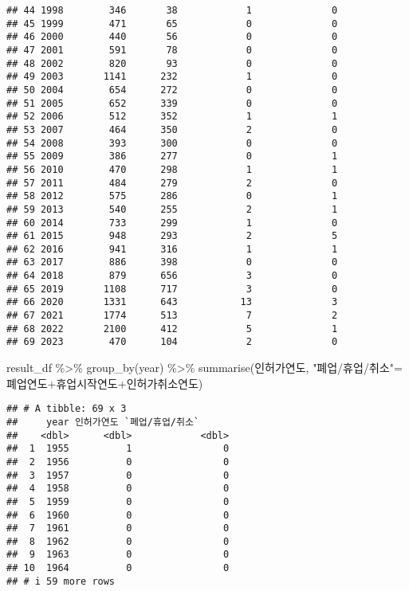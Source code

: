 \documentclass[
]{book}
\newenvironment{Shaded}{\begin{snugshade}}{\end{snugshade}}
\newcommand{\FunctionTok}[1]{\textcolor[rgb]{0.00,0.00,0.00}{#1}}
\newcommand{\NormalTok}[1]{#1}
\newcommand{\OtherTok}[1]{\textcolor[rgb]{0.56,0.35,0.01}{#1}}
\newcommand{\SpecialCharTok}[1]{\textcolor[rgb]{0.00,0.00,0.00}{#1}}
\newcommand{\StringTok}[1]{\textcolor[rgb]{0.31,0.60,0.02}{#1}}
\begin{document}
\begin{verbatim}
## 44 1998        346       38            1              0
## 45 1999        471       65            0              0
## 46 2000        440       56            0              0
## 47 2001        591       78            0              0
## 48 2002        820       93            0              0
## 49 2003       1141      232            1              0
## 50 2004        654      272            0              0
## 51 2005        652      339            0              0
## 52 2006        512      352            1              1
## 53 2007        464      350            2              0
## 54 2008        393      300            0              0
## 55 2009        386      277            0              1
## 56 2010        470      298            1              1
## 57 2011        484      279            2              0
## 58 2012        575      286            0              1
## 59 2013        540      255            2              1
## 60 2014        733      299            1              0
## 61 2015        948      293            2              5
## 62 2016        941      316            1              1
## 63 2017        886      398            0              0
## 64 2018        879      656            3              0
## 65 2019       1108      717            3              0
## 66 2020       1331      643           13              3
## 67 2021       1774      513            7              2
## 68 2022       2100      412            5              1
## 69 2023        470      104            2              0
\end{verbatim}

\begin{Shaded}
\begin{Highlighting}[]
\NormalTok{result\_df }\SpecialCharTok{\%\textgreater{}\%} 
  \FunctionTok{group\_by}\NormalTok{(year) }\SpecialCharTok{\%\textgreater{}\%}
  \FunctionTok{summarise}\NormalTok{(인허가연도, }\StringTok{"폐업/휴업/취소"}\OtherTok{=}\NormalTok{폐업연도}\SpecialCharTok{+}\NormalTok{휴업시작연도}\SpecialCharTok{+}\NormalTok{인허가취소연도)}
\end{Highlighting}
\end{Shaded}

\begin{verbatim}
## # A tibble: 69 x 3
##     year 인허가연도 `폐업/휴업/취소`
##    <dbl>      <dbl>            <dbl>
##  1  1955          1                0
##  2  1956          0                0
##  3  1957          0                0
##  4  1958          0                0
##  5  1959          0                0
##  6  1960          0                0
##  7  1961          0                0
##  8  1962          0                0
##  9  1963          0                0
## 10  1964          0                0
## # i 59 more rows
\end{verbatim}
\end{document}

